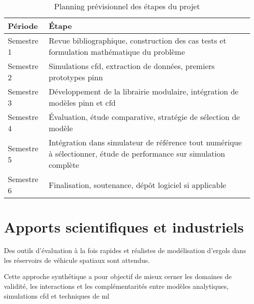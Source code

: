 \documentclass[12pt]{article}
\begin{document}
	\begin{table}[h]
		\centering
		\begin{tabularx}{\textwidth}{l X}
			
			\hline
			
			Période & Étape \\
			
			\hline
			
			Semestre 1 & Revue bibliographique, construction des cas tests et formulation mathématique du problème \\
			Semestre 2 & Simulations \acrshort{cfd}, extraction de données, premiers prototypes \acrshort{pinn} \\
			Semestre 3 & Développement de la librairie modulaire, intégration de modèles \acrshort{pinn} et \acrshort{cfd} \\
			Semestre 4 & Évaluation, étude comparative, stratégie de sélection de modèle \\
			Semestre 5 & Intégration dans simulateur de référence tout numérique à sélectionner, étude de performance sur simulation complète \\
			Semestre 6 & Finalisation, soutenance, dépôt logiciel si applicable \\
			
			\hline
			
		\end{tabularx}
		\caption{Planning prévisionnel des étapes du projet}
	\end{table}	
	
	\section*{Apports scientifiques et industriels}
	
	Des outils d'évaluation à la fois rapides et réalistes de modélisation d'ergols dans les réservoirs de véhicule spatiaux sont attendus.
	
	Cette approche synthétique a pour objectif de mieux cerner les domaines de validité, les interactions et les complémentarités entre modèles analytiques, simulations \acrshort{cfd} et techniques de \acrlong{ml}
	
\end{document}
